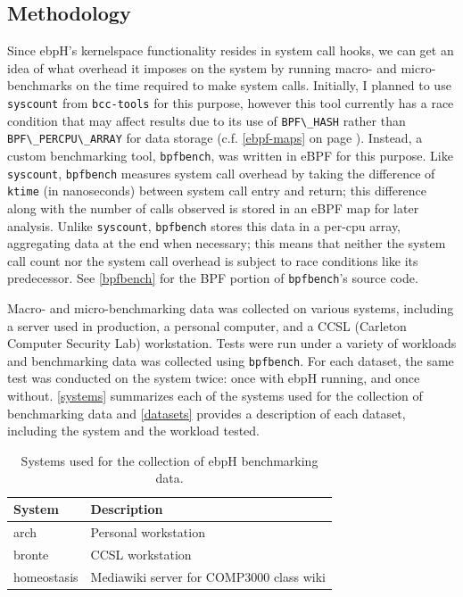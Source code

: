 \documentclass[
  12pt]{findlay}
\begin{document}
\hypertarget{methodology}{%
\subsection{Methodology}\label{methodology}}

\label{methodology-section}

Since ebpH's kernelspace functionality resides in system call hooks, we
can get an idea of what overhead it imposes on the system by running
macro- and micro-benchmarks on the time required to make system calls.
Initially, I planned to use \passthrough{\lstinline!syscount!}
\autocite{syscount} from \passthrough{\lstinline!bcc-tools!} for this
purpose, however this tool currently has a race condition that may
affect results due to its use of \passthrough{\lstinline!BPF\_HASH!}
rather than \passthrough{\lstinline!BPF\_PERCPU\_ARRAY!} for data
storage (c.f. \autoref{ebpf-maps} on page \pageref{ebpf-maps}). Instead,
a custom benchmarking tool,
\passthrough{\lstinline!bpfbench!}\footnotemark{}, was written in eBPF
for this purpose. Like \passthrough{\lstinline!syscount!},
\passthrough{\lstinline!bpfbench!} measures system call overhead by
taking the difference of \passthrough{\lstinline!ktime!} (in
nanoseconds) between system call entry and return; this difference along
with the number of calls observed is stored in an eBPF map for later
analysis. Unlike \passthrough{\lstinline!syscount!},
\passthrough{\lstinline!bpfbench!} stores this data in a per-cpu array,
aggregating data at the end when necessary; this means that neither the
system call count nor the system call overhead is subject to race
conditions like its predecessor. See \autoref{bpfbench} for the BPF
portion of \passthrough{\lstinline!bpfbench!}'s source code.

Macro- and micro-benchmarking data was collected on various systems,
including a server used in production, a personal computer, and a CCSL
(Carleton Computer Security Lab) workstation. Tests were run under a
variety of workloads and benchmarking data was collected using
\passthrough{\lstinline!bpfbench!}. For each dataset, the same test was
conducted on the system twice: once with ebpH running, and once without.
\autoref{systems} summarizes each of the systems used for the collection
of benchmarking data and \autoref{datasets} provides a description of
each dataset, including the system and the workload tested.

\begin{table}
    \caption{Systems used for the collection of ebpH benchmarking data.}
    \label{systems}
\begin{tabular}{>{\ttfamily}ll}
\toprule
      System &                               Description \\
\midrule
        arch &                      Personal workstation \\
      bronte &                          CCSL workstation \\
 homeostasis &  Mediawiki server for COMP3000 class wiki \\
\bottomrule
\end{tabular}
\end{table}
\end{document}
